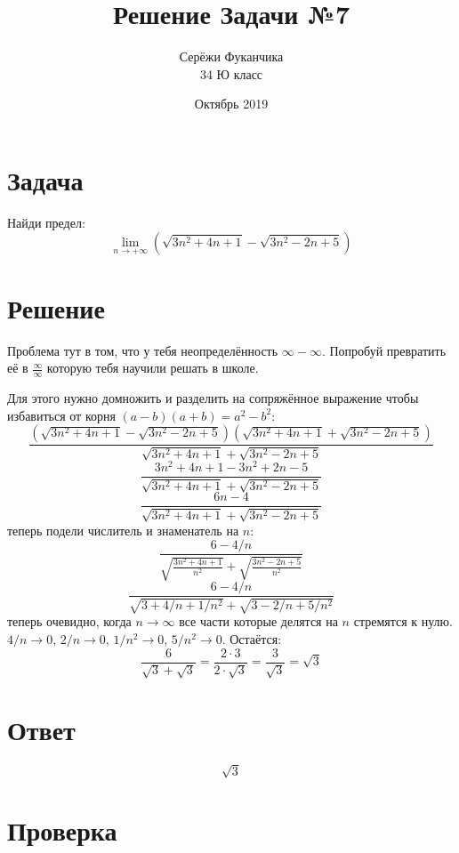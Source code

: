 \documentclass{article}
\title{Решение Задачи №7}
\author{Серёжи Фуканчика\\34 Ю класс}
\date{Октябрь 2019}
\begin{document}
\maketitle
\section{Задача}
Найди предел:
$$\lim_{n\to+\infty}{\left(\sqrt{3n^2+4n+1}-\sqrt{3n^2-2n+5}\right)}$$

\section{Решение}
Проблема тут в том, что у тебя неопределённость $\infty-\infty$. Попробуй превратить её в $\frac{\infty}{\infty}$ которую тебя научили решать в школе.

Для этого нужно домножить и разделить на сопряжённое выражение чтобы избавиться от корня $(a-b)(a+b)=a^2-b^2$:
$$\frac{\left(\sqrt{3n^2+4n+1}-\sqrt{3n^2-2n+5}\right)\left(\sqrt{3n^2+4n+1}+\sqrt{3n^2-2n+5}\right)}{\sqrt{3n^2+4n+1}+\sqrt{3n^2-2n+5}}$$
$$\frac{3n^2+4n+1-3n^2+2n-5}{\sqrt{3n^2+4n+1}+\sqrt{3n^2-2n+5}}$$
$$\frac{6n-4}{\sqrt{3n^2+4n+1}+\sqrt{3n^2-2n+5}}$$
теперь подели числитель и знаменатель на $n$:
$$\frac{6-4/n}{\sqrt{\frac{3n^2+4n+1}{n^2}}+\sqrt{\frac{3n^2-2n+5}{n^2}}}$$
$$\frac{6-4/n}{\sqrt{3+4/n+1/{n^2}}+\sqrt{3-2/n+5/{n^2}}}$$
теперь очевидно, когда $n\to\infty$ все части которые делятся на $n$ стремятся к нулю. $4/n\to{}0$, $2/n\to{}0$, $1/{n^2}\to0$, $5/{n^2}\to{}0$.
Остаётся:
$$\frac{6}{\sqrt{3}+\sqrt{3}}=\frac{2\cdot{}3}{2\cdot\sqrt{3}}=\frac{3}{\sqrt{3}}=\sqrt{3}$$

\section{Ответ}
$$\sqrt{3}$$

\section{Проверка}
\end{document}
